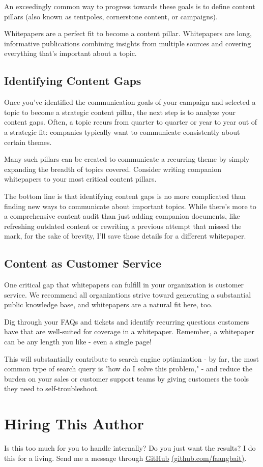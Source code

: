\documentclass[letterpaper]{article}
\begin{document}
An exceedingly common way to progress towards these goals is to define content pillars (also known as tentpoles, cornerstone content, or campaigns).

Whitepapers are a perfect fit to become a content pillar. Whitepapers are long, informative publications combining insights from multiple sources and covering everything that's important about a topic. 

\subsection{Identifying Content Gaps}
Once you've identified the communication goals of your campaign and selected a topic to become a strategic content pillar, the next step is to analyze your content gaps. Often, a topic recurs from quarter to quarter or year to year out of a strategic fit: companies typically want to communicate consistently about certain themes.

Many such pillars can be created to communicate a recurring theme by simply expanding the breadth of topics covered. Consider writing companion whitepapers to your most critical content pillars. 

The bottom line is that identifying content gaps is no more complicated than finding new ways to communicate about important topics. While there's more to a comprehensive content audit than just adding companion documents, like refreshing outdated content or rewriting a previous attempt that missed the mark, for the sake of brevity, I'll save those details for a different whitepaper.

\subsection{Content as Customer Service}
One critical gap that whitepapers can fulfill in your organization is customer service. We recommend all organizations strive toward generating a substantial public knowledge base, and whitepapers are a natural fit here, too.

Dig through your FAQs and tickets and identify recurring questions customers have that are well-suited for coverage in a whitepaper. Remember, a whitepaper can be any length you like - even a single page!

This will substantially contribute to search engine optimization - by far, the most common type of search query is "how do I solve this problem," - and reduce the burden on your sales or customer support teams by giving customers the tools they need to self-troubleshoot.

\section{Hiring This Author}
Is this too much for you to handle internally? Do you just want the results? I do this for a living. Send me a message through \href{https://github.com/faangbait}{\underline{GitHub}} \href{https://github.com/faangbait}{(\underline{github.com/faangbait})}.
\end{document}
